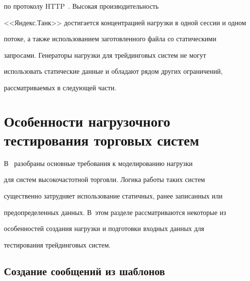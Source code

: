 по протоколу HTTP~\cite{14-g}. Высокая производительность


<<Яндекс.Танк>> достигается концентрацией нагрузки в одной сессии и одном


потоке, а также использованием заготовленного файла со статическими


запросами. Генераторы нагрузки для трейдинговых систем не могут


использовать статические данные и обладают рядом других ограничений,


рассматриваемых в следующей части.





\vspace*{-4pt}





\section{Особенности нагрузочного тестирования торговых систем}





\vspace*{-2pt}





  В~\cite{15-g} разобраны основные требования к моделированию нагрузки


для систем высокочастотной торговли. Логика работы таких систем


существенно затрудняет использование статичных, ранее записанных или


предопределенных данных. В~этом разделе рассматриваются некоторые из


особенностей создания нагрузки и подготовки входных данных для


тестирования трейдинговых систем.





\vspace*{-6pt}





\subsection{Создание сообщений из шаблонов}





